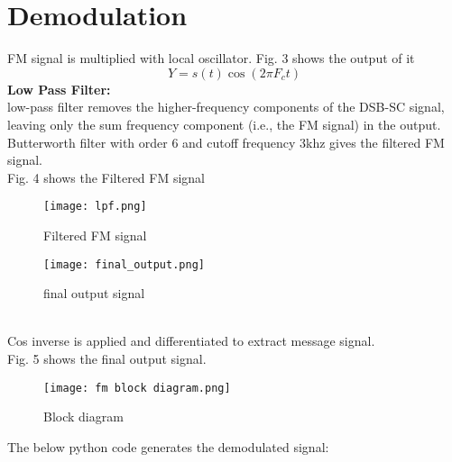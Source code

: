 \documentclass[journal,12pt,twocolumn]{article}
\begin{document}
\section{Demodulation}
FM signal is multiplied with local oscillator.
Fig. 3 shows the output of it\\
 \begin{equation}
 Y=s(t) \cos(2 \pi F_c t )
 \label{eq:carrier_signal} 
 \end{equation}
\newline
\textbf{Low Pass Filter:}\\
low-pass filter removes the higher-frequency components of the DSB-SC signal, leaving only the sum frequency component (i.e., the FM signal) in the output.\\
Butterworth filter with order 6 and cutoff frequency 3khz gives the filtered FM signal.\\
Fig. 4 shows the Filtered FM signal
\newline
\begin{figure}
\texttt{[image: lpf.png]} 
\label{fig:Filtered_FM}
\caption{Filtered FM signal}
\end{figure}
\begin{figure}
\texttt{[image: final\_output.png]} 
\label{fig:Final_Output}
\caption{final output signal}
\end{figure}\\
Cos inverse is applied and differentiated to extract message signal.\\
Fig. 5 shows the final output signal.
\\
\begin{figure}
\texttt{[image: fm block diagram.png]} 
\label{fig:Block_diagram}
\caption{Block diagram}
\end{figure}
The below python code generates the demodulated signal:
  
    \vspace{0.5cm}
\end{document}
